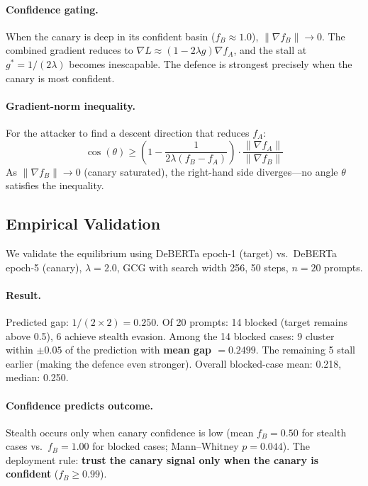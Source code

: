 \documentclass{article}
\begin{document}
\paragraph{Confidence gating.} When the canary is deep in its confident basin ($f_B \approx 1.0$), $\|\nabla f_B\| \to 0$. The combined gradient reduces to $\nabla L \approx (1 - 2\lambda g)\nabla f_A$, and the stall at $g^* = 1/(2\lambda)$ becomes inescapable. The defence is strongest precisely when the canary is most confident.

\paragraph{Gradient-norm inequality.} For the attacker to find a descent direction that reduces $f_A$:
\begin{equation}
\cos(\theta) \geq \left(1 - \frac{1}{2\lambda(f_B - f_A)}\right) \cdot \frac{\|\nabla f_A\|}{\|\nabla f_B\|}
\end{equation}
As $\|\nabla f_B\| \to 0$ (canary saturated), the right-hand side diverges---no angle $\theta$ satisfies the inequality.

\subsection{Empirical Validation}
\label{sec:empirical-equilibrium}

We validate the equilibrium using DeBERTa epoch-1 (target) vs.\ DeBERTa epoch-5 (canary), $\lambda = 2.0$, GCG with search width 256, 50 steps, $n = 20$ prompts.

\paragraph{Result.} Predicted gap: $1/(2 \times 2) = 0.250$. Of 20 prompts: 14 blocked (target remains above 0.5), 6 achieve stealth evasion. Among the 14 blocked cases: 9 cluster within $\pm 0.05$ of the prediction with \textbf{mean gap $= 0.2499$}. The remaining 5 stall earlier (making the defence even stronger). Overall blocked-case mean: 0.218, median: 0.250.

\paragraph{Confidence predicts outcome.} Stealth occurs only when canary confidence is low (mean $f_B = 0.50$ for stealth cases vs.\ $f_B = 1.00$ for blocked cases; Mann--Whitney $p = 0.044$). The deployment rule: \textbf{trust the canary signal only when the canary is confident} ($f_B \geq 0.99$).
\end{document}
